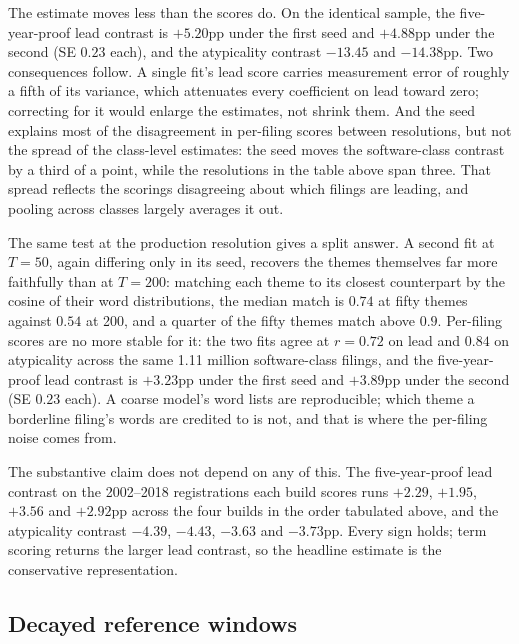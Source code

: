 The estimate moves less than the scores do. On the identical sample, the
five-year-proof lead contrast is $+5.20$pp under the first seed and $+4.88$pp under
the second (SE $0.23$ each), and the atypicality contrast $-13.45$ and
$-14.38$pp. Two consequences follow. A single fit's lead score carries
measurement error of roughly a fifth of its variance, which attenuates every
coefficient on lead toward zero; correcting for it would enlarge the
estimates, not shrink them. And the seed explains most of the disagreement
in per-filing scores between resolutions, but not the spread of the
class-level estimates: the seed moves the software-class contrast by a
third of a point, while the resolutions in the table above span three.
That spread reflects the scorings disagreeing about which filings are
leading, and pooling across classes largely averages it out.

The same test at the production resolution gives a split answer. A
second fit at $T = 50$, again differing only in its seed, recovers the
themes themselves far more faithfully than at $T = 200$: matching each
theme to its closest counterpart by the cosine of their word
distributions, the median match is $0.74$ at fifty themes against $0.54$
at 200, and a quarter of the fifty themes match above $0.9$. Per-filing
scores are no more stable for it: the two fits agree at $r = 0.72$ on
lead and $0.84$ on atypicality across the same 1.11 million
software-class filings, and the five-year-proof lead contrast is
$+3.23$pp under the first seed and $+3.89$pp under the second (SE $0.23$
each). A coarse model's word lists are reproducible; which theme a
borderline filing's words are credited to is not, and that is where the
per-filing noise comes from.

The substantive claim does not depend on any of this. The five-year-proof
lead contrast on the 2002--2018 registrations each build scores runs
$+2.29$, $+1.95$, $+3.56$ and $+2.92$pp across the four builds in the
order tabulated above, and the atypicality contrast $-4.39$, $-4.43$,
$-3.63$ and $-3.73$pp. Every sign holds; term scoring returns the larger
lead contrast, so the headline estimate is the conservative
representation.

\subsection{Decayed reference windows}\label{sec:robust_decay}

